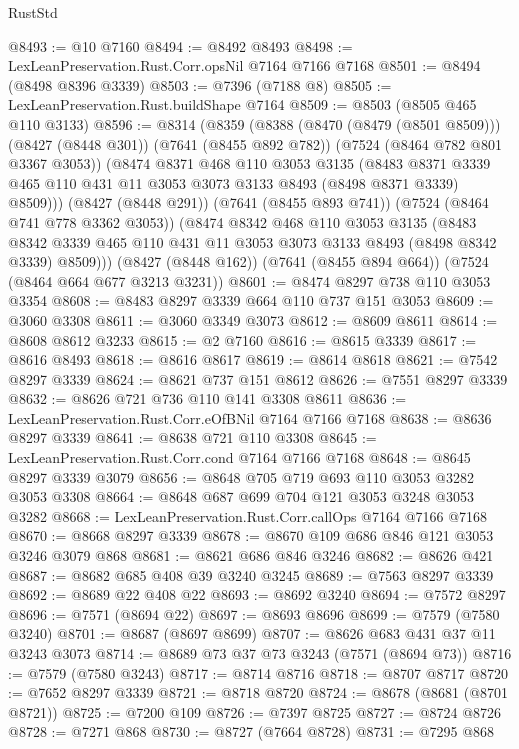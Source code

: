 \begin{lexlean}{RustStd}
\begin{coremodule}
{\begin{coremodule}
{{{{{{{{{{{{{{{{{{{{{{{{{{{{{{{{@8493 := @10 @7160
@8494 := @8492 @8493
@8498 := LexLeanPreservation.Rust.Corr.opsNil @7164 @7166 @7168
@8501 := @8494 (@8498 @8396 @3339)
@8503 := @7396 (@7188 @8)
@8505 := LexLeanPreservation.Rust.buildShape @7164
@8509 := @8503 (@8505 @465 @110 @3133)
@8596 := @8314
    (@8359
      (@8388
        (@8470 (@8479 (@8501 @8509)))
        (@8427 (@8448 @301))
        (@7641 (@8455 @892 @782))
        (@7524 (@8464 @782 @801 @3367 @3053))
        (@8474
          @8371
          @468
          @110
          @3053
          @3135
          (@8483 @8371 @3339 @465 @110 @431 @11 @3053 @3073 @3133 @8493 (@8498 @8371 @3339) @8509)))
      (@8427 (@8448 @291))
      (@7641 (@8455 @893 @741))
      (@7524 (@8464 @741 @778 @3362 @3053))
      (@8474
        @8342
        @468
        @110
        @3053
        @3135
        (@8483 @8342 @3339 @465 @110 @431 @11 @3053 @3073 @3133 @8493 (@8498 @8342 @3339) @8509)))
    (@8427 (@8448 @162))
    (@7641 (@8455 @894 @664))
    (@7524 (@8464 @664 @677 @3213 @3231))
@8601 := @8474 @8297 @738 @110 @3053 @3354
@8608 := @8483 @8297 @3339 @664 @110 @737 @151 @3053
@8609 := @3060 @3308
@8611 := @3060 @3349 @3073
@8612 := @8609 @8611
@8614 := @8608 @8612 @3233
@8615 := @2 @7160
@8616 := @8615 @3339
@8617 := @8616 @8493
@8618 := @8616 @8617
@8619 := @8614 @8618
@8621 := @7542 @8297 @3339
@8624 := @8621 @737 @151 @8612
@8626 := @7551 @8297 @3339
@8632 := @8626 @721 @736 @110 @141 @3308 @8611
@8636 := LexLeanPreservation.Rust.Corr.eOfBNil @7164 @7166 @7168
@8638 := @8636 @8297 @3339
@8641 := @8638 @721 @110 @3308
@8645 := LexLeanPreservation.Rust.Corr.cond @7164 @7166 @7168
@8648 := @8645 @8297 @3339 @3079
@8656 := @8648 @705 @719 @693 @110 @3053 @3282 @3053 @3308
@8664 := @8648 @687 @699 @704 @121 @3053 @3248 @3053 @3282
@8668 := LexLeanPreservation.Rust.Corr.callOps @7164 @7166 @7168
@8670 := @8668 @8297 @3339
@8678 := @8670 @109 @686 @846 @121 @3053 @3246 @3079 @868
@8681 := @8621 @686 @846 @3246
@8682 := @8626 @421
@8687 := @8682 @685 @408 @39 @3240 @3245
@8689 := @7563 @8297 @3339
@8692 := @8689 @22 @408 @22
@8693 := @8692 @3240
@8694 := @7572 @8297
@8696 := @7571 (@8694 @22)
@8697 := @8693 @8696
@8699 := @7579 (@7580 @3240)
@8701 := @8687 (@8697 @8699)
@8707 := @8626 @683 @431 @37 @11 @3243 @3073
@8714 := @8689 @73 @37 @73 @3243 (@7571 (@8694 @73))
@8716 := @7579 (@7580 @3243)
@8717 := @8714 @8716
@8718 := @8707 @8717
@8720 := @7652 @8297 @3339
@8721 := @8718 @8720
@8724 := @8678 (@8681 (@8701 @8721))
@8725 := @7200 @109
@8726 := @7397 @8725
@8727 := @8724 @8726
@8728 := @7271 @868
@8730 := @8727 (@7664 @8728)
@8731 := @7295 @868
}}}}}}}}}}}}}}}}}}}}}}}}}}}}}}}}
\end{coremodule}}
\end{coremodule}
\end{lexlean}
